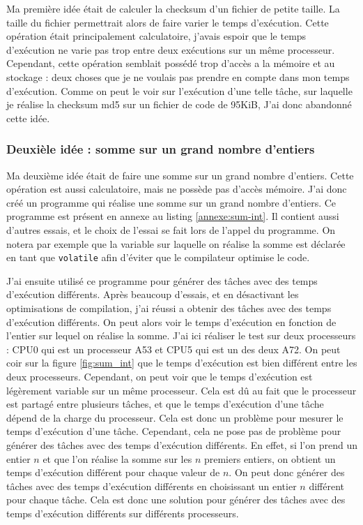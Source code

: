 Ma première idée était de calculer la checksum d'un fichier de petite taille. La taille du fichier permettrait alors de faire varier le temps d’exécution. Cette opération était principalement calculatoire, j'avais espoir que le temps d'exécution ne varie pas trop entre deux exécutions sur un même processeur. Cependant, cette opération semblait possédé trop d’accès a la mémoire et au stockage : deux choses que je ne voulais pas prendre en compte dans mon temps d'exécution. Comme on peut le voir sur l'exécution d'une telle tâche, sur laquelle je réalise la \gls{checksum md5} sur un fichier de code de 95KiB, J'ai donc abandonné cette idée.

\subsubsection{Deuxièle idée : somme sur un grand nombre d'entiers}

Ma deuxième idée était de faire une somme sur un grand nombre d'entiers. Cette opération est aussi calculatoire, mais ne possède pas d'accès mémoire. J'ai donc créé un programme qui réalise une somme sur un grand nombre d'entiers. Ce programme est présent en annexe au listing \ref{annexe:sum-int}. Il contient aussi d'autres essais, et le choix de l'essai se fait lors de l'appel du programme. On notera par exemple que la variable sur laquelle on réalise la somme est déclarée en tant que \texttt{volatile} afin d'éviter que le compilateur optimise le code.

J'ai ensuite utilisé ce programme pour générer des tâches avec des temps d'exécution différents. Après beaucoup d'essais, et en désactivant les optimisations de compilation, j'ai réussi a obtenir des tâches avec des temps d'exécution différents. On peut alors voir le temps d'exécution en fonction de l'entier sur lequel on réalise la somme. J'ai ici réaliser le test sur deux processeurs : CPU0 qui est un processeur A53 et CPU5 qui est un des deux A72. On peut coir sur la figure \ref{fig:sum_int} que le temps d'exécution est bien différent entre les deux processeurs. Cependant, on peut voir que le temps d'exécution est légèrement variable sur un même processeur. Cela est dû au fait que le processeur est partagé entre plusieurs tâches, et que le temps d'exécution d'une tâche dépend de la charge du processeur. Cela est donc un problème pour mesurer le temps d'exécution d'une tâche. Cependant, cela ne pose pas de problème pour générer des tâches avec des temps d'exécution différents. En effet, si l'on prend un entier $n$ et que l'on réalise la somme sur les $n$ premiers entiers, on obtient un temps d'exécution différent pour chaque valeur de $n$. On peut donc générer des tâches avec des temps d'exécution différents en choisissant un entier $n$ différent pour chaque tâche. Cela est donc une solution pour générer des tâches avec des temps d'exécution différents sur différents processeurs.

